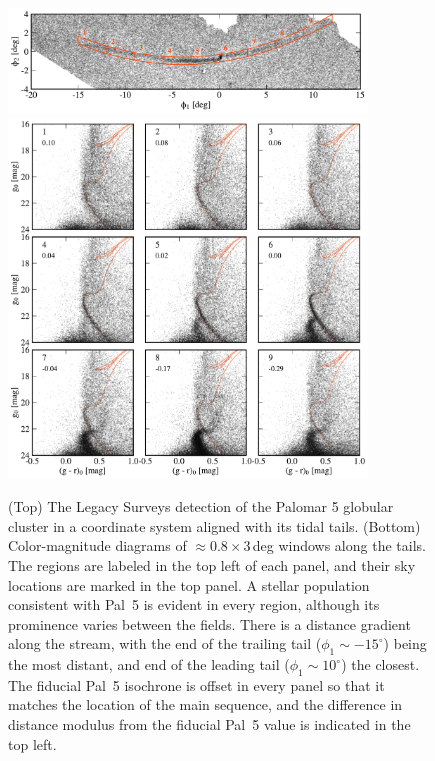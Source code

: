 \documentclass[twocolumn]{aastex62}
\begin{document}
\begin{figure}
\begin{center}
\includegraphics[width=0.85\textwidth]{fig1_a_map.pdf}
\includegraphics[width=0.85\textwidth]{fig1_b_cmds.pdf}
\end{center}
\caption{
(Top) The Legacy Surveys detection of the Palomar 5 globular cluster in a coordinate system aligned with its tidal tails.
(Bottom) Color-magnitude diagrams of $\approx0.8\times3$\,deg windows along the tails.
The regions are labeled in the top left of each panel, and their sky locations are marked in the top panel.
A stellar population consistent with Pal~5 is evident in every region, although its prominence varies between the fields.
There is a distance gradient along the stream, with the end of the trailing tail ($\phi_1\sim-15^\circ$) being the most distant, and end of the leading tail ($\phi_1\sim10^\circ$) the closest.
The fiducial Pal~5 isochrone is offset in every panel so that it matches the location of the main sequence, and the difference in distance modulus from the fiducial Pal~5 value is indicated in the top left.
}
\label{fig:cmds}
\end{figure}
\end{document}
